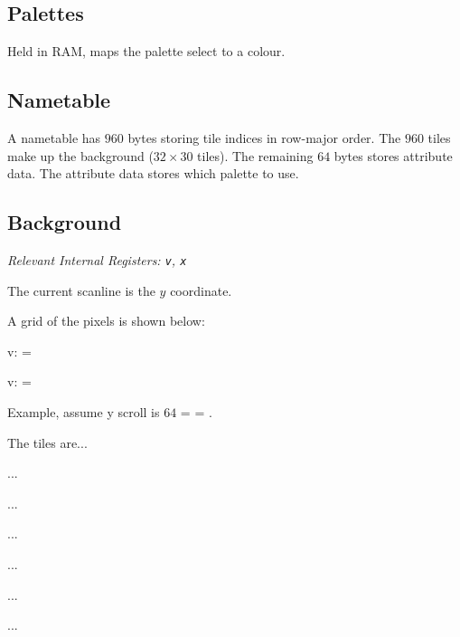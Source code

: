 \subsection{Palettes}

Held in RAM, maps the palette select to a colour.

\subsection{Nametable}

A nametable has $960$ bytes storing tile indices in row-major order.
The $960$ tiles make up the background ($32 \times 30$ tiles).
The remaining $64$ bytes stores attribute data.
The attribute data stores which palette to use.

\subsection{Background}

\textit{Relevant Internal Registers: \texttt{v}, \texttt{x}}

The current scanline is the $y$ coordinate.

A grid of the pixels is shown below:


v:  = 

v:  = 


Example, assume y scroll is  $64$ =  = .

The tiles are...

 ... 

 ... 

...

 ... 

 ... 

 ... 

